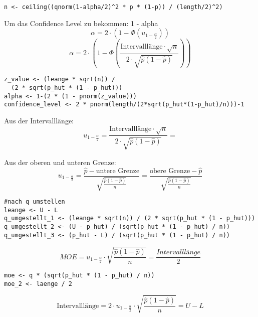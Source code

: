 \begin{multicols*}{2}

\begin{lstlisting}
n <- ceiling((qnorm(1-alpha/2)^2 * p * (1-p)) / (length/2)^2)
\end{lstlisting}

\columnbreak
{}

\textcolor{red}{\warning}Um das Confidence Level zu bekommen: 1 - alpha \textcolor{red}{\warning}
$$
\alpha = 2 \cdot \left( 1 - \Phi\left(u_{1 - \frac{\alpha}{2}}\right) \right)
$$
$$
\alpha = 2 \cdot \left( 1 - \Phi\left(\frac{\text{Intervalll\"ange} \cdot \sqrt{n}}{2 \cdot \sqrt{\hat{p}(1-\hat{p})}}\right) \right)
$$

\begin{lstlisting}
z_value <- (leange * sqrt(n)) / 
  (2 * sqrt(p_hut * (1 - p_hut)))
alpha <- 1-(2 * (1 - pnorm(z_value)))
confidence_level <- 2 * pnorm(length/(2*sqrt(p_hut*(1-p_hut)/n)))-1

\end{lstlisting}



Aus der Intervalll\"ange:
\[
u_{1 - \frac{\alpha}{2}} = \frac{\text{Intervalll\"ange} \cdot \sqrt{n}}{2 \cdot \sqrt{\hat{p}(1-\hat{p})}} = 
\]




Aus der oberen und unteren Grenze:
\[
u_{1 - \frac{\alpha}{2}} = \frac{\hat{p} - \text{untere Grenze}}{\sqrt{\frac{\hat{p}(1-\hat{p})}{n}}} = \frac{\text{obere Grenze} - \hat{p}}{\sqrt{\frac{\hat{p}(1-\hat{p})}{n}}}
\]

\begin{lstlisting}
#nach q umstellen
leange <- U - L
q_umgestellt_1 <- (leange * sqrt(n)) / (2 * sqrt(p_hut * (1 - p_hut)))
q_umgestellt_2 <- (U - p_hut) / (sqrt(p_hut * (1 - p_hut) / n))
q_umgestellt_3 <- (p_hut - L) / (sqrt(p_hut * (1 - p_hut) / n))
\end{lstlisting}

\[
MOE = u_{1 - \frac{\alpha}{2}} \cdot \sqrt{\frac{\hat{p}(1-\hat{p})}{n}}= \frac{Intervalllänge}{2}
\]

\begin{lstlisting}
moe <- q * (sqrt(p_hut * (1 - p_hut) / n))
moe_2 <- laenge / 2
\end{lstlisting}

\[
\text{Intervalll\"ange} = 2 \cdot u_{1 - \frac{\alpha}{2}} \cdot \sqrt{\frac{\hat{p}(1-\hat{p})}{n}} = U - L
\] 


\end{multicols*}
